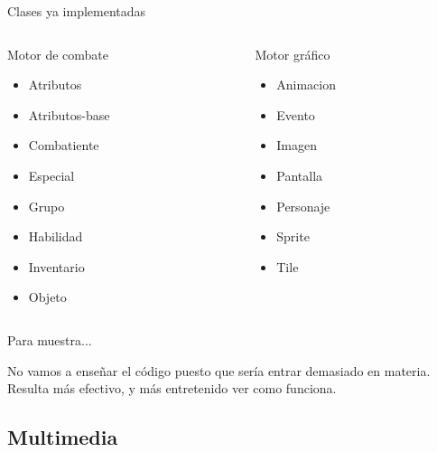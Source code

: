 \documentclass[9pt,xcolor=svgnames]{beamer}
\begin{document}
  \begin{frame}{Clases ya implementadas}
   
    \begin{columns}
     
     \begin{column}{3cm}
      \begin{block}{Motor de combate}
       \begin{itemize}
	\item Atributos
	\item Atributos-base
	\item Combatiente
	\item Especial
	\item Grupo
	\item Habilidad
	\item Inventario
	\item Objeto      
       \end{itemize}
      \end{block}
     \end{column}
     
     \begin{column}{3cm}
      \begin{block}{Motor gráfico}
       \begin{itemize}
	\item Animacion
	\item Evento
	\item Imagen
	\item Pantalla
	\item Personaje
	\item Sprite
	\item Tile
       \end{itemize}
      \end{block}
     \end{column}
     
    \end{columns}
  \end{frame}
  
  \begin{frame}{Para muestra...}
   
   No vamos a enseñar el código puesto que sería entrar demasiado en
   materia.\\
   
   Resulta más efectivo, y más entretenido ver como funciona.
   
  \end{frame}
  
  
  \subsection{Multimedia}
  
\end{document}

